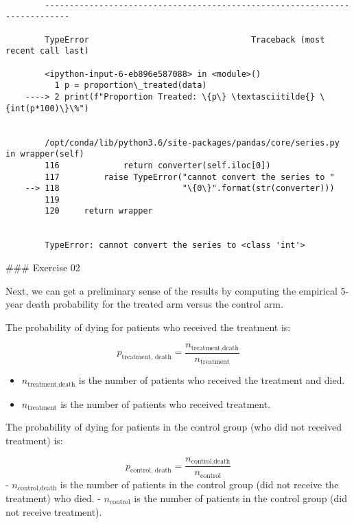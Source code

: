 \documentclass[11pt]{article}
\providecommand{\tightlist}{%
      \setlength{\itemsep}{0pt}\setlength{\parskip}{0pt}}
\begin{document}
    \begin{Verbatim}[commandchars=\\\{\}]

        ---------------------------------------------------------------------------

        TypeError                                 Traceback (most recent call last)

        <ipython-input-6-eb896e587088> in <module>()
          1 p = proportion\_treated(data)
    ----> 2 print(f"Proportion Treated: \{p\} \textasciitilde{} \{int(p*100)\}\%")
    

        /opt/conda/lib/python3.6/site-packages/pandas/core/series.py in wrapper(self)
        116             return converter(self.iloc[0])
        117         raise TypeError("cannot convert the series to "
    --> 118                         "\{0\}".format(str(converter)))
        119 
        120     return wrapper


        TypeError: cannot convert the series to <class 'int'>

    \end{Verbatim}

     \#\#\# Exercise 02

Next, we can get a preliminary sense of the results by computing the
empirical 5-year death probability for the treated arm versus the
control arm.

The probability of dying for patients who received the treatment is:

\[p_{\text{treatment, death}} = \frac{n_{\text{treatment,death}}}{n_{\text{treatment}}}\]

\begin{itemize}
\tightlist
\item
  \(n_{\text{treatment,death}}\) is the number of patients who received
  the treatment and died.
\item
  \(n_{\text{treatment}}\) is the number of patients who received
  treatment.
\end{itemize}

The probability of dying for patients in the control group (who did not
received treatment) is:

\[p_{\text{control, death}} = \frac{n_{\text{control,death}}}{n_{\text{control}}}\]
- \(n_{\text{control,death}}\) is the number of patients in the control
group (did not receive the treatment) who died. - \(n_{\text{control}}\)
is the number of patients in the control group (did not receive
treatment).
\end{document}
